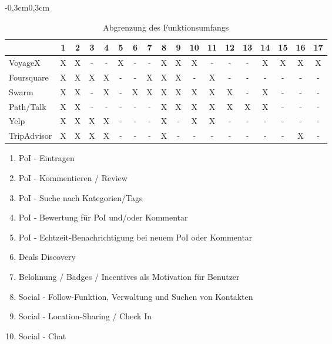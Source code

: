 	\begin{table}[H]
	\begin{adjustwidth}{-0,3cm}{0,3cm}
		\centering
		\begin{tabulary}{18cm}{|L|C|C|C|C|C|C|C|C|C|C|C|C|C|C|C|C|C|}
		\hline
			 & \textbf{1} & \textbf{2} & \textbf{3} & \textbf{4} & \textbf{5} & \textbf{6} & \textbf{7} & \textbf{8} & \textbf{9} & \textbf{10} & \textbf{11} & \textbf{12} & \textbf{13} & \textbf{14} & \textbf{15} & \textbf{16} & \textbf{17} \\ \hline
			VoyageX     & X & X & - & - & X & - & - & X & X & X & - & - & - & X & X & X & X \\ \hline
			Foursquare  & X & X & X & X & - & - & X & X & X & - & X & - & - & - & - & - & - \\ \hline
			Swarm	    & X & X & - & X & - & X & X & X & X & X & X & X & - & X & - & - & - \\ \hline
			Path/Talk 	& X & X & - & - & - & - & - & X & X & X & X & X & X & X & - & - & - \\ \hline
			Yelp        & X & X & X & X & - & - & - & X & - & X & X & - & - & - & - & - & - \\ \hline
			TripAdvisor & X & X & X & X & - & - & - & X & - & - & - & - & - & - & - & X & - \\ \hline
		\end{tabulary}
	\caption{Abgrenzung des Funktionsumfangs}{
\vspace{0.2cm}
\begin{enumerate}[labelwidth=0pt,leftmargin=39pt,noitemsep,topsep=0pt,parsep=0pt,partopsep=0pt]
\item PoI - Eintragen%
\item PoI - Kommentieren / Review
\item PoI - Suche nach Kategorien/Tags
\item PoI - Bewertung für PoI und/oder Kommentar
\item PoI - Echtzeit-Benachrichtigung bei neuem PoI oder Kommentar
\item Deals Discovery 
\item Belohnung / Badges / Incentives als Motivation für Benutzer
\item Social - Follow-Funktion, Verwaltung und Suchen von Kontakten
\item Social - Location-Sharing / Check In
\item Social - Chat

\end{enumerate}}
\end{adjustwidth}
\end{table}
